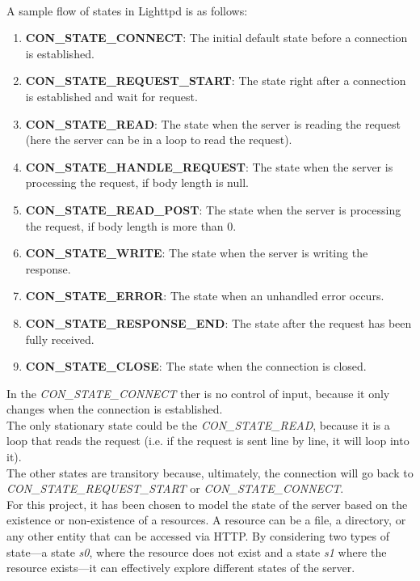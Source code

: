 \\A sample flow of states in Lighttpd is as follows:
\begin{enumerate}
    \item \textbf{CON\_STATE\_CONNECT}: The initial default state before a connection is established.
    
    \item \textbf{CON\_STATE\_REQUEST\_START}: The state right after a connection is established and wait for request.
    
    \item \textbf{CON\_STATE\_READ}: The state when the server is reading the request (here the server can be in a loop to read the request).
    
    \item \textbf{CON\_STATE\_HANDLE\_REQUEST}: The state when the server is processing the request, if body length is null.
    
    \item \textbf{CON\_STATE\_READ\_POST}: The state when the server is processing the request, if body length is more than 0.
    
    \item \textbf{CON\_STATE\_WRITE}: The state when the server is writing the response.
    \item \textbf{CON\_STATE\_ERROR}: The state when an unhandled error occurs.
    
    \item \textbf{CON\_STATE\_RESPONSE\_END}: The state after the request has been fully received.
    
    \item \textbf{CON\_STATE\_CLOSE}: The state when the connection is closed.
\end{enumerate}
In the \textit{CON\_STATE\_CONNECT} ther is no control of input, because it only changes when the connection is established.
\\The only stationary state could be the \textit{CON\_STATE\_READ}, because it is a loop that reads the request (i.e. if the request is sent line by line, it will loop into it).
\\The other states are transitory because, ultimately, the connection will go back to \textit{CON\_STATE\_REQUEST\_START} or \textit{CON\_STATE\_CONNECT}.
\\For this project, it has been chosen to model the state of the server based on the existence or non-existence of a resources. A resource can be a file, a directory, or any other entity that can be accessed via HTTP. By considering two types of state—a state \textit{s0}, where the resource does not exist and a state \textit{s1} where the resource exists—it can effectively explore different states of the server.

